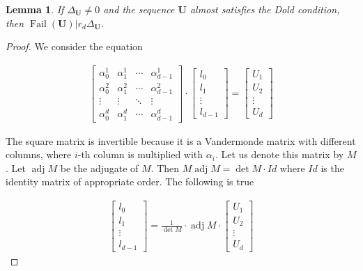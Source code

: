 \documentclass[preprint,12pt]{elsarticle}
\DeclareMathOperator{\fail}{Fail}
\DeclareMathOperator{\adj}{adj}
\newtheorem{lemma}{Lemma}
\begin{document}
\begin{lemma}\label{lem_fail_del}
    If $\Delta_\mathbf{U} \not= 0$ and the sequence $\mathbf{U}$  almost satisfies the Dold condition, then $\fail(\mathbf{U}) | r_d\Delta_\mathbf{U}$.
\end{lemma}
\begin{proof}
    

We consider the equation

\begin{align}
    \begin{bmatrix}
        \alpha_0^{1} & \alpha_1^{1} & \cdots & \alpha_{d-1}^{1}\\
        \alpha_0^{2} & \alpha_1^{2} & \cdots & \alpha_{d-1}^{2}\\
        \vdots & \vdots & \ddots & \vdots \\
        \alpha_0^{d} & \alpha_1^{d} & \cdots & \alpha_{d-1}^{d}
    \end{bmatrix}
    \cdot
    \begin{bmatrix}
        l_0 \\ l_1 \\ \vdots \\ l_{d-1}
    \end{bmatrix}
    =
    \begin{bmatrix}
        U_1 \\  U_2 \\ \vdots \\  U_{d}
    \end{bmatrix}
\end{align}

The square matrix is invertible because it is a Vandermonde matrix with different columns, where $i$-th column is multiplied with $\alpha_i$. Let us denote this matrix by $M$. Let $\adj M$ be the adjugate of $M$. Then  $M\adj M  = \det M \cdot Id$ where $Id$ is the identity matrix of appropriate order. The following is true

\begin{align}\label{eq_li}
    \begin{bmatrix}
        l_0 \\ l_1 \\ \vdots \\ l_{d-1}
    \end{bmatrix}
    =
    \frac{1}{\det M}
    \cdot
    \adj M
    \cdot
    \begin{bmatrix}
         U_1 \\  U_2 \\ \vdots \\  U_{d}
    \end{bmatrix}
\end{align}


\end{proof}
\end{document}
